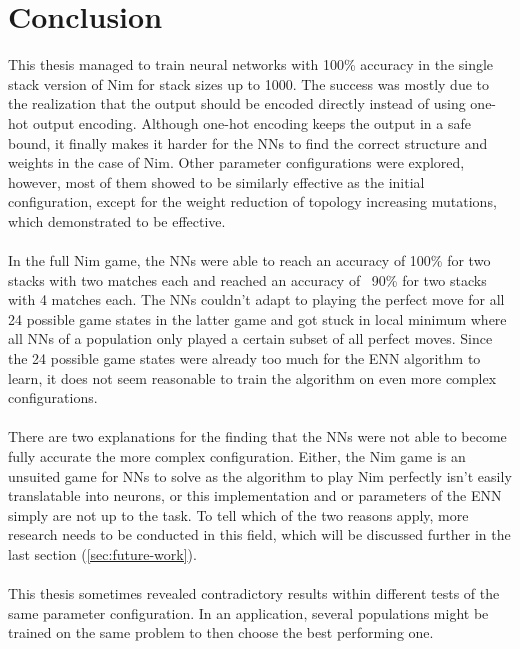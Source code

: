 \section{Conclusion}\label{sec:conclusion}
This thesis managed to train neural networks with 100\% accuracy in the single stack version of Nim for stack sizes up to 1000.
The success was mostly due to the realization that the output should be encoded directly instead of using one-hot output encoding.
Although one-hot encoding keeps the output in a safe bound, it finally makes it harder for the NNs to find the correct structure and weights in the case of Nim.
Other parameter configurations were explored, however, most of them showed to be similarly effective as the initial configuration, except for the weight reduction of topology increasing mutations, which demonstrated to be effective.
\\ \\
In the full Nim game, the NNs were able to reach an accuracy of 100\% for two stacks with two matches each and reached an accuracy of ~90\% for two stacks with 4 matches each.
The NNs couldn't adapt to playing the perfect move for all 24 possible game states in the latter game and got stuck in local minimum where all NNs of a population only played a certain subset of all perfect moves.
Since the 24 possible game states were already too much for the ENN algorithm to learn, it does not seem reasonable to train the algorithm on even more complex configurations.
\\\\
There are two explanations for the finding that the NNs were not able to become fully accurate the more complex configuration.
Either, the Nim game is an unsuited game for NNs to solve as the algorithm to play Nim perfectly isn't easily translatable into neurons, or this implementation and or parameters of the ENN simply are not up to the task.
To tell which of the two reasons apply, more research needs to be conducted in this field, which will be discussed further in the last section (\ref{sec:future-work}).
\\ \\
This thesis sometimes revealed contradictory results within different tests of the same parameter configuration.
In an application, several populations might be trained on the same problem to then choose the best performing one.


